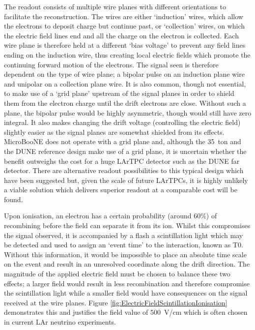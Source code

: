 The readout consists of multiple wire planes with different orientations to facilitate the reconstruction.  The wires are either `induction' wires, which allow the electrons to deposit charge but continue past, or `collection' wires, on which the electric field lines end and all the charge on the electron is collected.  Each wire plane is therefore held at a different `bias voltage' to prevent any field lines ending on the induction wire, thus creating local electric fields which promote the continuing forward motion of the electrons.  The signal seen is therefore dependent on the type of wire plane; a bipolar pulse on an induction plane wire and unipolar on a collection plane wire.  It is also common, though not essential, to make use of a `grid plane' upstream of the signal planes in order to shield them from the electron charge until the drift electrons are close.  Without such a plane, the bipolar pulse would be highly asymmetric, though would still have zero integral.  It also makes changing the drift voltage (controlling the electric field) slightly easier as the signal planes are somewhat shielded from its effects.  MicroBooNE does not operate with a grid plane and, although the 35~ton and the DUNE reference design make use of a grid plane, it is uncertain whether the benefit outweighs the cost for a huge LArTPC detector such as the DUNE far detector.  There are alternative readout possibilities to this typical design which have been suggested but, given the scale of future LArTPCs, it is highly unlikely a viable solution which delivers superior readout at a comparable cost will be found.

Upon ionisation, an electron has a certain probability (around 60\%) of recombining before the field can separate it from its ion.  Whilst this compromises the signal observed, it is accompanied by a flash a scintillation light which may be detected and used to assign an `event time' to the interaction, known as T0.  Without this information, it would be impossible to place an absolute time scale on the event and result in an unresolved coordinate along the drift direction.  The magnitude of the applied electric field must be chosen to balance these two effects; a larger field would result in less recombination and therefore compromise the scintillation light while a smaller field would have consequences on the signal received at the wire planes.  Figure \ref{fig:ElectricFieldScintillationIonisation} demonstrates this and justifies the field value of 500~V/cm which is often chosen in current LAr neutrino experiments.

